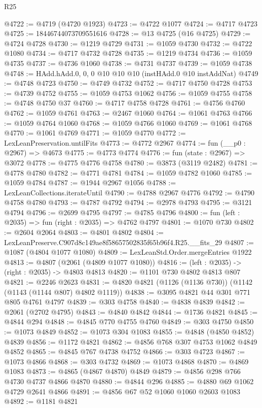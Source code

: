 \begin{lexlean}{R25}
\begin{coremodule}
@4722 := @4719 (@4720 @1923)
@4723 := @4722 @1077
@4724 := @4717 @4723
@4725 := 18446744073709551616
@4728 := @13 @4725 (@16 @4725)
@4729 := @4724 @4728
@4730 := @1219 @4729
@4731 := @1059 @4730
@4732 := @4722 @1080
@4734 := @4717 @4732 @4728
@4735 := @1219 @4734
@4736 := @1059 @4735
@4737 := @4736 @1060
@4738 := @4731 @4737
@4739 := @1059 @4738
@4748 := HAdd.hAdd.{0, 0, 0} @10 @10 @10 (instHAdd.{0} @10 instAddNat)
@4749 := @4748 @4723
@4750 := @4749 @4732
@4752 := @4717 @4750 @4728
@4753 := @4739 @4752
@4755 := @1059 @4753 @1062
@4756 := @1059 @4755
@4758 := @4748 @4750 @37
@4760 := @4717 @4758 @4728
@4761 := @4756 @4760
@4762 := @1059 @4761
@4763 := @2467 @1060
@4764 := @1061 @4763
@4766 := @1059 @4764 @1060
@4768 := @1059 @4766 @1060
@4769 := @1061 @4768
@4770 := @1061 @4769
@4771 := @1059 @4770
@4772 := LexLeanPreservation.untilFits
@4773 := @4772 @2967
@4774 := fun (__p0 : @2967) => @4673
@4775 := @4773 @4774
@4776 := fun (state : @2967) => @3072
@4778 := @4775 @4776 @4758
@4780 := @3873 (@3119 @2482)
@4781 := @4778 @4780
@4782 := @4771 @4781
@4784 := @1059 @4782 @1060
@4785 := @1059 @4784
@4787 := @1944 @2967 @1056
@4788 := LexLeanCollections.iterateUntil
@4790 := @4788 @2967 @4776
@4792 := @4790 @4758 @4780
@4793 := @4787 @4792
@4794 := @2978 @4793
@4795 := @3121 @4794
@4796 := @2699 @4795
@4797 := @4785 @4796
@4800 := fun (left : @2035) => fun (right : @2035) => @4762 @4797
@4801 := @1070 @730
@4802 := @2604 @2064
@4803 := @4801 @4802
@4804 := LexLeanPreserve.C907d8c149ae8f58657502835f65b96f4.R25.__fits_29
@4807 := @1087 (@4804 @1077 @1080)
@4809 := LexLeanStd.Order.mergeEntries @1922
@4813 := @4807 (@2061 (@4809 @1077 @1080))
@4816 := (left : @2035) -> (right : @2035) -> @4803 @4813
@4820 := @1101 @730 @4802 @4813 @807
@4821 := @2246 @2623
@4831 := @4820 @4821 (@1126 (@1136 @730)) (@1142 (@1143 (@1144 @807) @4802 @1119))
@4838 := @3095 @4821 @44 @301 @771 @805 @4761 @4797
@4839 := @303 @4758
@4840 := @4838 @4839
@4842 := @2061 (@2702 @4795)
@4843 := @4840 @4842
@4844 := @1736 @4821
@4845 := @4844 @294
@4848 := @4845 @770 @4755 @4760
@4849 := @303 @4750
@4850 := @1073 @4849
@4852 := @1073 @304 @1083
@4855 := @4848 (@4850 @4852) @4839
@4856 := @1172 @4821
@4862 := @4856 @768 @307 @4753 @1062 @4849 @4852
@4865 := @4845 @767 @4738 @4752
@4866 := @303 @4723
@4867 := @1073 @4866
@4868 := @303 @4732
@4869 := @1073 @4868
@4870 := @4869 @1083
@4873 := @4865 (@4867 @4870) @4849
@4879 := @4856 @298 @766 @4730 @4737 @4866 @4870
@4880 := @4844 @296
@4885 := @4880 @69 @1062 @4729 @2641 @4866
@4891 := @4856 @67 @52 @1060 @1060 @2603 @1083
@4892 := @1181 @4821

\end{coremodule}
\end{lexlean}
